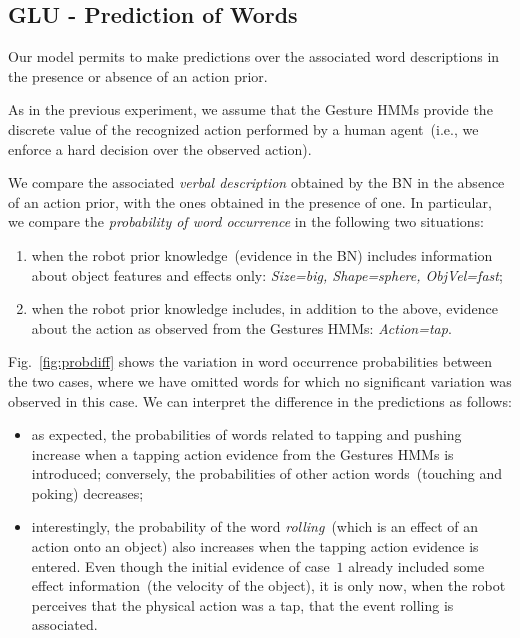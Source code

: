 \subsection{GLU - Prediction of Words}

Our model permits to make predictions over the associated word descriptions in the presence or absence of an action prior.

As in the previous experiment, we assume that the Gesture \acp{HMM} provide the discrete value of the recognized action performed by a human agent~(i.e., we enforce a hard decision over the observed action).

We compare the associated \emph{verbal description} obtained by the \acl{BN} in the absence of an action prior, with the ones obtained in the presence of one. In particular, we compare the \emph{probability of word occurrence} in the following two situations:
\begin{enumerate}
\item when the robot prior knowledge~(evidence in the \ac{BN}) includes information about object features and effects only: \emph{Size=big, Shape=sphere, ObjVel=fast};

\item when the robot prior knowledge includes, in addition to the above, evidence about the action as observed from the Gestures \acp{HMM}: \emph{Action=tap}.
\end{enumerate}

Fig.~\ref{fig:probdiff} shows the variation in word occurrence probabilities between the two cases, where we have omitted words for which no significant variation was observed in this case. We can interpret the difference in the predictions as follows:
\begin{itemize}
\item as expected, the probabilities of words related to tapping and pushing increase when a tapping action evidence from the Gestures \acp{HMM} is introduced; conversely, the probabilities of other action words~(touching and poking) decreases;

\item interestingly, the probability of the word \emph{rolling}~(which is an effect of an action onto an object) also increases when the tapping action evidence is entered. Even though the initial evidence of case~$1$ already included some effect information~(the velocity of the object), it is only now, when the robot perceives that the physical action was a tap, that the event rolling is associated.
\end{itemize}

